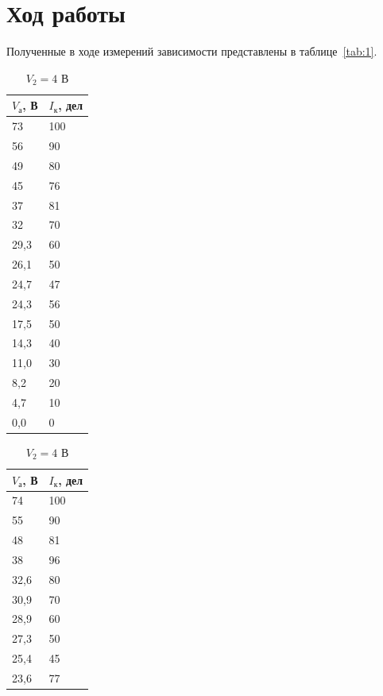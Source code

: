 \documentclass[a4paper]{article}
\begin{document}
\section{Ход работы}
Полученные в ходе измерений зависимости представлены в таблице~\ref{tab:1}.

\begin{table}[h]
\centering
\begin{subtable}[h]{0.25\textwidth}
\centering
\begin{tabular}{|l|l|}
\hline
$V_{\text{а}} $, В     & $I_{\text{к}}$, дел    \\ \hline
73   & 100 \\ \hline
56   & 90  \\ \hline
49   & 80  \\ \hline
45   & 76  \\ \hline
37   & 81  \\ \hline
32   & 70  \\ \hline
29,3 & 60  \\ \hline
26,1 & 50  \\ \hline
24,7 & 47  \\ \hline
24,3 & 56  \\ \hline
17,5 & 50  \\ \hline
14,3 & 40  \\ \hline
11,0   & 30  \\ \hline
8,2  & 20  \\ \hline
4,7  & 10  \\ \hline
0,0    & 0   \\ \hline
\end{tabular}
\caption{$V_2=4 \text{ В}$ }
\end{subtable}
\hfill
\begin{subtable}[h]{0.25\textwidth}
\centering
\begin{tabular}{|l|l|}
\hline
$V_{\text{а}} $, В     & $I_{\text{к}}$, дел    \\ \hline
74   & 100 \\ \hline
55   & 90  \\ \hline
48   & 81  \\ \hline
38   & 96  \\ \hline
32,6 & 80  \\ \hline
30,9 & 70  \\ \hline
28,9 & 60  \\ \hline
27,3 & 50  \\ \hline
25,4 & 45  \\ \hline
23,6 & 77  \\ \hline

\end{tabular}
\end{subtable}
\end{table}
\end{document}
